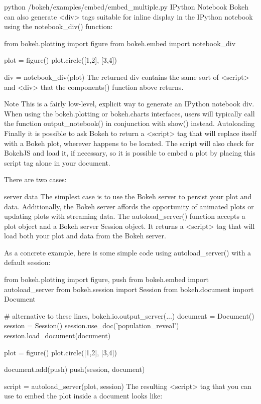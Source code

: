 python /bokeh/examples/embed/embed_multiple.py
IPython Notebook
Bokeh can also generate <div> tags suitable for inline display in the IPython notebook using the notebook_div() function:

from bokeh.plotting import figure
from bokeh.embed import notebook_div

plot = figure()
plot.circle([1,2], [3,4])

div = notebook_div(plot)
The returned div contains the same sort of <script> and <div> that the components() function above returns.

Note
This is a fairly low-level, explicit way to generate an IPython notebook div. When using the bokeh.plotting or bokeh.charts interfaces, users will typically call the function output_notebook() in conjunction with show() instead.
Autoloading
Finally it is possible to ask Bokeh to return a <script> tag that will replace itself with a Bokeh plot, wherever happens to be located. The script will also check for BokehJS and load it, if necessary, so it is possible to embed a plot by placing this script tag alone in your document.



There are two cases:

server data
The simplest case is to use the Bokeh server to persist your plot and data. Additionally, the Bokeh server affords the opportunity of animated plots or updating plots with streaming data. The autoload_server() function accepts a plot object and a Bokeh server Session object. It returns a <script> tag that will load both your plot and data from the Bokeh server.

As a concrete example, here is some simple code using autoload_server() with a default session:

from bokeh.plotting import figure, push
from bokeh.embed import autoload_server
from bokeh.session import Session
from bokeh.document import Document

# alternative to these lines, bokeh.io.output_server(...)
document = Document()
session = Session()
session.use_doc('population_reveal')
session.load_document(document)

plot = figure()
plot.circle([1,2], [3,4])

document.add(push)
push(session, document)

script = autoload_server(plot, session)
The resulting <script> tag that you can use to embed the plot inside a document looks like:

